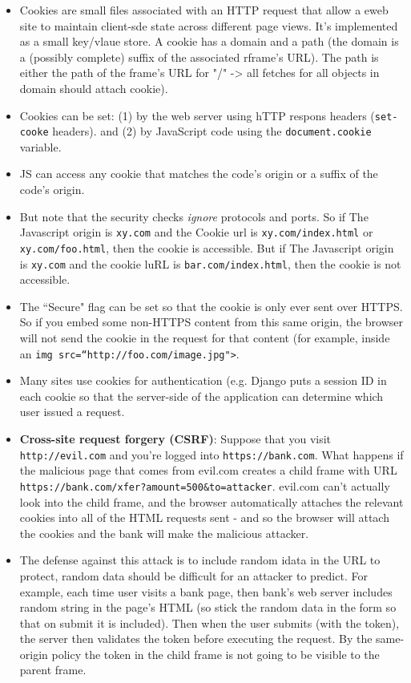 \documentclass[12pt]{article}
\theoremstyle{definition}
\begin{document}
\begin{itemize}
    \itemsep0em 
	\item  Cookies are small files associated with an HTTP request that allow a eweb site to maintain client-sde state across different page views. It's implemented as a small key/vlaue store. A cookie has a domain and a path (the domain is a (possibly complete) suffix of the associated rframe's URL). The path is either the path of the frame's URL for "/" -> all fetches for all objects in domain should attach cookie).
    \item Cookies can be set: (1) by the web server using hTTP respons headers (\texttt{set-cooke} headers). and (2) by JavaScript code using the \texttt{document.cookie} variable.
    \item JS can access any cookie that matches the code's origin or a suffix of the code's origin.
    \item But note that the security checks \textit{ignore} protocols and ports. So if The Javascript origin is \texttt{xy.com} and the Cookie url is \texttt{xy.com/index.html} or \texttt{xy.com/foo.html}, then the cookie is accessible. But if The Javascript origin is \texttt{xy.com} and the cookie luRL is \texttt{bar.com/index.html}, then the cookie is not accessible.
    \item The ``Secure" flag can be set so that the cookie is only ever sent over HTTPS. So if you embed some non-HTTPS content from this same origin, the browser will not send the cookie in the request for that content (for example, inside an \texttt{img src=``http://foo.com/image.jpg">}.
    \item Many sites use cookies for authentication (e.g. Django puts a session ID in each cookie so that the server-side of the application can determine which user issued a request.
    \item \textbf{Cross-site request forgery (CSRF)}: Suppose that you visit \texttt{http://evil.com} and you're logged into \texttt{https://bank.com}. What happens if the malicious page that comes from evil.com creates a child frame with URL \texttt{https://bank.com/xfer?amount=500\&to=attacker}. evil.com can't actually look into the child frame, and the browser automatically attaches the relevant cookies into all of the HTML requests sent - and so the browser will attach the cookies and the bank will make the malicious attacker.
    \item The defense against this attack is to include random idata in the URL to protect, random data should be difficult for an attacker to predict. For example, each time user visits a bank page, then bank's web server includes random string in the page's HTML (so stick the random data in the form so that on submit it is included). Then when the user submits (with the token), the server then validates the token before executing the request. By the same-origin policy the token in the child frame is not going to be visible to the parent frame.

\end{itemize}
\end{document}
